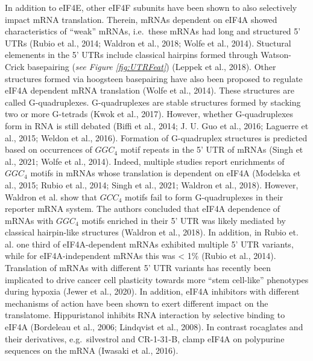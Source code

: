\documentclass[12pt,openany]{book}
\begin{document}
In addition to eIF4E, other eIF4F subunits have been shown to also
selectively impact mRNA translation. Therein, mRNAs dependent on eIF4A
showed characteristics of ``weak'' mRNAs, i.e.~these mRNAs had long and
structured 5' UTRs (Rubio et al., 2014; Waldron et al., 2018; Wolfe et
al., 2014). Stuctural elemenents in the 5' UTRs include classical
hairpins formed through Watson-Crick basepairing (\emph{see Figure
\ref{fig:UTRFeat}}) (Leppek et al., 2018). Other structures formed via
hoogsteen basepairing have also been proposed to regulate eIF4A
dependent mRNA translation (Wolfe et al., 2014). These structures are
called G-quadruplexes. G-quadruplexes are stable structures formed by
stacking two or more G-tetrads (Kwok et al., 2017). However, whether
G-quadruplexes form in RNA is still debated (Biffi et al., 2014; J. U.
Guo et al., 2016; Laguerre et al., 2015; Weldon et al., 2016). Formation
of G-quadruplex structures is predicted based on occurrences of
\(GGC_4\) motif repeats in the 5' UTR of mRNAs (Singh et al., 2021;
Wolfe et al., 2014). Indeed, multiple studies report enrichments of
\(GGC_4\) motifs in mRNAs whose translation is dependent on eIF4A
(Modelska et al., 2015; Rubio et al., 2014; Singh et al., 2021; Waldron
et al., 2018). However, Waldron et al. show that \(GCC_4\) motifs fail
to form G-quadruplexes in their reporter mRNA system. The authors
concluded that eIF4A dependence of mRNAs with \(GGC_4\) motifs enriched
in their 5' UTR was likely mediated by classical hairpin-like structures
(Waldron et al., 2018). In addition, in Rubio et. al. one third of
eIF4A-dependent mRNAs exhibited multiple 5' UTR variants, while for
eIF4A-independent mRNAs this was \textless{} 1\% (Rubio et al., 2014).
Translation of mRNAs with different 5' UTR variants has recently been
implicated to drive cancer cell plasticity towards more ``stem
cell-like'' phenotypes during hypoxia (Jewer et al., 2020). In addition,
eIF4A inhibitors with different mechanisms of action have been shown to
exert different impact on the translatome. Hippuristanol inhibits RNA
interaction by selective binding to eIF4A (Bordeleau et al., 2006;
Lindqvist et al., 2008). In contrast rocaglates and their derivatives,
e.g.~silvestrol and CR-1-31-B, clamp eIF4A on polypurine sequences on
the mRNA (Iwasaki et al., 2016).
\end{document}
